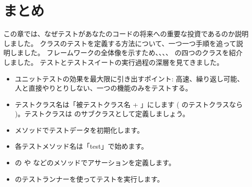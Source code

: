 \documentclass[a4paper,10pt,twoside]{book}
\begin{document}



\section{まとめ}

この章では、なぜテストがあなたのコードの将来への重要な投資であるのか説明しました。
 クラスのテストを定義する方法について、一つ一つ手順を追って説明しました。
\sunit フレームワークの全体像を示すため、、、、 の四つのクラスを紹介しました。
テストとテストスイートの実行過程の深層を見てきました。

\begin{itemize}
  \item ユニットテストの効果を最大限に引き出すポイント: 高速、繰り返し可能、人と直接やりとりしない、一つの機能のみをテストする。
  \item テストクラス名は「被テストクラス名 + 」にします ( のテストクラスなら )。テストクラスは  のサブクラスとして定義しましょう。
  \item {} メソッドでテストデータを初期化します。
  \item 各テストメソッド名は「test」で始めます。
  \item {} の  や  などのメソッドでアサーションを定義します。
  \item \sunit のテストランナーを使ってテストを実行します。%
\end{itemize}

\ifx\wholebook\relax\else
   
   
\end{document}
